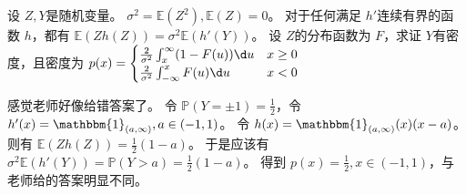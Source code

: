 \documentclass{ctexart}
\begin{document}
\begin{problem}\label{pro:2}
  设 \(Z,Y \)是随机变量。 \(\sigma^2 = \mathbb{E}(Z^2), \mathbb{E}(Z) = 0\)。
  对于任何满足 \(h' \)连续有界的函数 \(h \)，都有
  \(\mathbb{E}(Zh(Z)) = \sigma^2\mathbb{E}(h'(Y)) \)。
  设 \(Z \)的分布函数为 \(F \)，求证 \(Y \)有密度，且密度为 \(p(x) =
    \begin{cases}
      \frac{2}{\sigma^2} \int_{x}^{\infty}(1-F(u)) \d u & x \geq 0\\
      \frac{2}{\sigma^2} \int_{-\infty}^{x}F(u) \d u & x < 0
  \end{cases} \)
\end{problem}
\begin{solution}
  感觉老师好像给错答案了。
  令 \(\mathbb{P}(Y = \pm 1) = \frac{1}{2} \)，令 \(h'(x) = \mathbbm{1}_{(a,\infty)},a \in (-1,1) \)。
  令 \(h(x) = \mathbbm{1}_{(a,\infty)}(x) (x-a) \)。
  则有 \(\mathbb{E}(Zh(Z)) = \frac{1}{2} (1-a) \)。
  于是应该有 \(\sigma^2 \mathbb{E}(h'(Y)) = \mathbb{P}(Y>a) = \frac{1}{2}(1-a) \)。
  得到 \(p(x) = \frac{1}{2}, x \in (-1,1) \)，与老师给的答案明显不同。

\end{solution}
\end{document}
